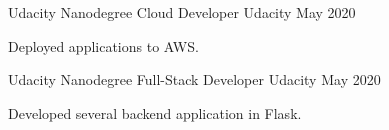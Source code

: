 \begin{cventries}
  \cventry
    {Udacity Nanodegree} %
    {Cloud Developer} %
    {Udacity} %
    {May 2020} %
    {
      \begin{cvitems} %
        \item {Deployed applications to AWS.}
      \end{cvitems}
    }

  \cventry
    {Udacity Nanodegree} %
    {Full-Stack Developer} %
    {Udacity} %
    {May 2020} %
    {
      \begin{cvitems} %
        \item {Developed several backend application in Flask.}
      \end{cvitems}
    }
    

\end{cventries}
